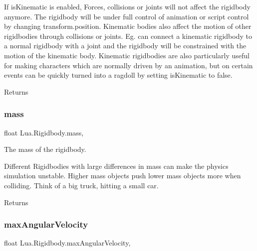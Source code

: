 If is\+Kinematic is enabled, Forces, collisions or joints will not affect the rigidbody anymore. The rigidbody will be under full control of animation or script control by changing transform.\+position. Kinematic bodies also affect the motion of other rigidbodies through collisions or joints. Eg. can connect a kinematic rigidbody to a normal rigidbody with a joint and the rigidbody will be constrained with the motion of the kinematic body. Kinematic rigidbodies are also particularly useful for making characters which are normally driven by an animation, but on certain events can be quickly turned into a ragdoll by setting is\+Kinematic to false. \begin{DoxyReturn}{Returns}

\end{DoxyReturn}
\mbox{\label{class_lua_1_1_rigidbody_aeab0f1c55ada296d501909dd61533a35}} 
\subsubsection{\texorpdfstring{mass}{mass}}
{\footnotesize\ttfamily float Lua.\+Rigidbody.\+mass\hspace{0.3cm}{\ttfamily [get]}, {\ttfamily [set]}}



The mass of the rigidbody. 

Different Rigidbodies with large differences in mass can make the physics simulation unstable. Higher mass objects push lower mass objects more when colliding. Think of a big truck, hitting a small car. \begin{DoxyReturn}{Returns}

\end{DoxyReturn}
\mbox{\label{class_lua_1_1_rigidbody_a8171fc4d6eb8d7e448eeb45f9fbc05d8}} 
\subsubsection{\texorpdfstring{maxAngularVelocity}{maxAngularVelocity}}
{\footnotesize\ttfamily float Lua.\+Rigidbody.\+max\+Angular\+Velocity\hspace{0.3cm}{\ttfamily [get]}, {\ttfamily [set]}}



